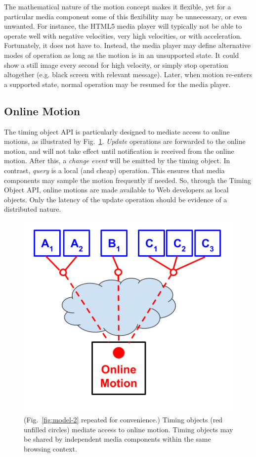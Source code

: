 \documentclass[graybox]{svmult}
\begin{document}
\label{sec:toomuch}

The mathematical nature of the motion concept makes it flexible, yet for a
particular media component some of this flexibility may be unnecessary, or
even unwanted. For instance, the HTML5 media player will typically not be able
to operate well with negative velocities, very high velocities, or with
acceleration. Fortunately, it does not have to. Instead, the media player may
define alternative modes of operation as long as the motion is in an
unsupported state. It could show a still image every second for high velocity,
or simply stop operation altogether (e.g. black screen with relevant message).
Later, when motion re-enters a supported state, normal operation may be
resumed for the media player.


\subsection{Online Motion}
\label{sec:motionsync}

The timing object API is particularly designed to mediate access to online motions,
as illustrated by Fig.~\ref{fig:model-repeat}. \emph{Update} operations are forwarded to the
online motion, and will not take effect until notification is received from
the online motion. After this, a \emph{change event} will be emitted by the timing object. In contrast, \emph{query} is a local
(and cheap) operation. This ensures that media components may sample the
motion frequently if needed. So, through the Timing Object API, online motions
are made available to Web developers as local objects. Only the latency of the
update operation should be evidence of a distributed nature.

\begin{figure}[h]
\centering
\includegraphics[scale=.3]{fig/motion-model-2.png}
\caption{(Fig.~\ref{fig:model-2} repeated for convenience.) Timing objects (red unfilled circles) mediate access to online motion. Timing objects may be shared by independent media components within the same browsing context.}
\label{fig:model-repeat}
\end{figure}
\end{document}
